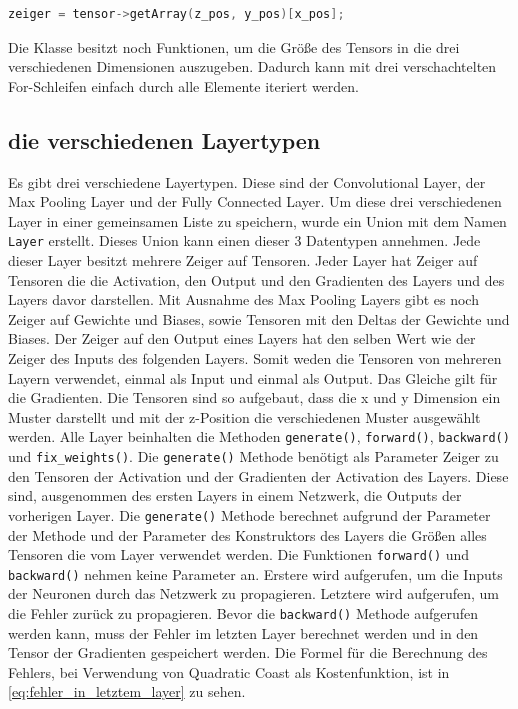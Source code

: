 \documentclass[../main.tex]{subfiles}
\begin{document}
\begin{lstlisting}[language=c++, caption=Verwendung der getArray()-Funktion, captionpos=b, label=listing:verwendung_get_array, frame=single, linewidth=\textwidth, breaklines=true]
zeiger = tensor->getArray(z_pos, y_pos)[x_pos];
\end{lstlisting}
Die Klasse besitzt noch Funktionen, um die Größe des Tensors in die drei verschiedenen Dimensionen auszugeben. Dadurch kann mit drei verschachtelten For-Schleifen einfach durch alle Elemente iteriert werden.

\subsection{die verschiedenen Layertypen}
Es gibt drei verschiedene Layertypen. Diese sind der Convolutional Layer, der Max Pooling Layer und der Fully Connected Layer. Um diese drei verschiedenen Layer in einer gemeinsamen Liste zu speichern, wurde ein Union mit dem Namen \texttt{Layer} erstellt. Dieses Union kann einen dieser 3 Datentypen annehmen. 
Jede dieser Layer besitzt mehrere Zeiger auf Tensoren. Jeder Layer hat Zeiger auf Tensoren die die Activation, den Output und den Gradienten des Layers und des Layers davor darstellen. Mit Ausnahme des Max Pooling Layers gibt es noch Zeiger auf Gewichte und Biases, sowie Tensoren mit den Deltas der Gewichte und Biases. Der Zeiger auf den Output eines Layers hat den selben Wert wie der Zeiger des Inputs des folgenden Layers. Somit weden die Tensoren von mehreren Layern verwendet, einmal als Input und einmal als Output. Das Gleiche gilt für die Gradienten. Die Tensoren sind so aufgebaut, dass die x und y Dimension ein Muster darstellt und mit der z-Position die verschiedenen Muster ausgewählt werden.
Alle Layer beinhalten die Methoden \texttt{generate()}, \texttt{forward()}, \texttt{backward()} und \texttt{fix\_weights()}.
 Die \texttt{generate()} Methode benötigt als Parameter Zeiger zu den Tensoren der Activation und der Gradienten der Activation des Layers. Diese sind, ausgenommen des ersten Layers in einem Netzwerk, die Outputs der vorherigen Layer. Die \texttt{generate()} Methode berechnet aufgrund der Parameter der Methode und der Parameter des Konstruktors des Layers die Größen alles Tensoren die vom Layer verwendet werden.
Die Funktionen \texttt{forward()} und \texttt{backward()} nehmen keine Parameter an. Erstere wird aufgerufen, um die Inputs der Neuronen durch das Netzwerk zu propagieren. Letztere wird aufgerufen, um die Fehler zurück zu propagieren. 
Bevor die \texttt{backward()} Methode aufgerufen werden kann, muss der Fehler im letzten Layer berechnet werden und in den Tensor der Gradienten gespeichert werden. Die Formel für die Berechnung des Fehlers, bei Verwendung von Quadratic Coast als Kostenfunktion, ist in \ref{eq:fehler_in_letztem_layer} zu sehen.
\end{document}
